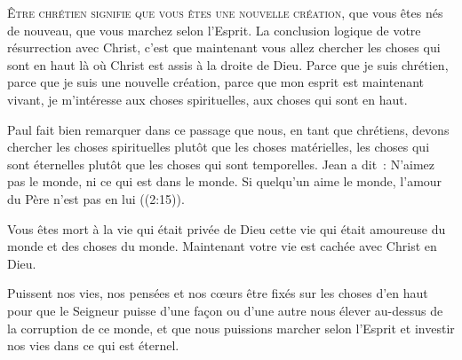 \dvrule






\lettrine{Ê}{tre chrétien signifie que vous êtes une nouvelle création,}
 que vous êtes nés de nouveau, que vous marchez selon l'Esprit.
 La conclusion logique de votre résurrection avec Christ,
 c'est que maintenant vous allez chercher  les choses
 qui sont en haut là où Christ est assis à la droite de Dieu.
 Parce que je suis chrétien, parce que je suis une nouvelle création,
 parce que mon esprit est maintenant vivant, je m'intéresse aux choses
 spirituelles, aux choses qui sont en haut.


Paul fait bien  remarquer dans ce passage
 que nous, en tant que chrétiens, devons chercher les choses spirituelles
 plutôt que les choses matérielles, les choses qui sont éternelles plutôt
 que les choses qui sont temporelles. Jean a dit~: 
 \og N'aimez pas le monde, ni ce qui est dans le monde.
 Si quelqu'un aime le monde, l'amour du Père n'est pas en lui \fg{}
 ((2:15)). 

Vous êtes mort à la vie qui était privée de Dieu
 \ocadr cette vie qui était amoureuse du monde et des choses du monde.
 Maintenant votre vie est cachée avec Christ en Dieu.

Puissent nos vies, nos pensées et nos cœurs être fixés
 sur les choses d'en haut \ocadr pour que le Seigneur puisse d'une façon
 ou d'une autre nous élever au-dessus de la corruption de ce monde,
 et que nous puissions marcher selon l'Esprit et investir nos vies
 dans ce qui est éternel.

\dvrule

